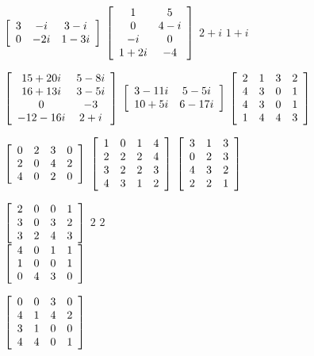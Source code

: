 \begin{enumerate}[!HW!, start=1]
\begin{multicols}{3}
\end{multicols}
\begin{multicols}{3}
\itemspade $\mtx{ccc}{3 & -i & 3-i \\ 0 & -2i & 1-3i}$
\itemspade $\mtx{cc}{1&5\\0&4-i\\-i&0\\1+2i&-4}$ \columnbreak
\itemspade $2+i$
\itemspade $1+i$ \\ \mbox{}\vfill\mbox{}
\end{multicols}
\begin{multicols}{3}
\itemspade $\mtx{cc}{15+20i & 5-8i\\ 16+13i & 3-5i \\ 0 & -3 \\ -12-16i & 2+i}$
\itemspade $\mtx{cc}{3-11i&5-5i\\10+5i&6-17i}$
\itemspade $\mtx{rrrr}{2&1&3&2\\4&3&0&1\\4&3&0&1\\1&4&4&3}$
\end{multicols}
\begin{multicols}{3}
\itemspade $\mtx{rrrr}{0&2&3&0\\2&0&4&2\\4&0&2&0}$
\itemspade $\mtx{rrrr}{1&0&1&4\\2&2&2&4\\3&2&2&3\\4&3&1&2}$
\itemspade $\mtx{rrr}{3&1&3\\0&2&3\\4&3&2\\2&2&1}$
\end{multicols}
\begin{multicols}{3}
\itemspade $\mtx{rrrr}{2&0&0&1\\3&0&3&2\\3&2&4&3}$
\itemspade $2$
\itemspade $2$ \\ \mbox{}\vfill\mbox{}\columnbreak
\itemspade $\mtx{rrrr}{4&0&1&1\\1&0&0&1\\0&4&3&0}$\columnbreak
\end{multicols}
\begin{multicols}{3}
\itemspade $\mtx{rrrr}{0&0&3&0\\4&1&4&2\\3&1&0&0\\4&4&0&1}$


\end{multicols}
\end{enumerate}
